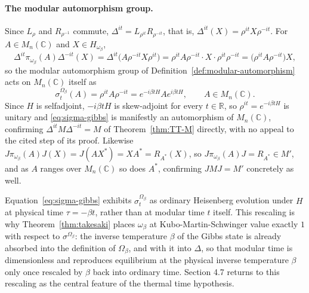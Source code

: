 \paragraph{The modular automorphism group.}
Since $L_\rho$ and $R_{\rho^{-1}}$ commute, $\Delta^{it} = L_{\rho^{it}}R_{\rho^{-it}}$, that is, $\Delta^{it}(X) = \rho^{it}X\rho^{-it}$. For $A \in M_n(\mathbb{C})$ and $X \in H_{\omega_\beta}$,
\[
\Delta^{it}\pi_{\omega_\beta}(A)\Delta^{-it}(X) = \Delta^{it}\big(A\rho^{-it}X\rho^{it}\big) = \rho^{it}A\rho^{-it}\cdot X \cdot \rho^{it}\rho^{-it} = \big(\rho^{it}A\rho^{-it}\big)X,
\]
so the modular automorphism group of Definition~\ref{def:modular-automorphism} acts on $M_n(\mathbb{C})$ itself as
\begin{equation}\label{eq:sigma-gibbs}
	\sigma_t^{\Omega_\beta}(A) = \rho^{it}A\rho^{-it} = e^{-i\beta t H}Ae^{i\beta t H}, \qquad A \in M_n(\mathbb{C}).
\end{equation}
Since $H$ is selfadjoint, $-i\beta t H$ is skew-adjoint for every $t \in \mathbb{R}$, so $\rho^{it}=e^{-i\beta t H}$ is unitary and \eqref{eq:sigma-gibbs} is manifestly an automorphism of $M_n(\mathbb{C})$, confirming $\Delta^{it}M\Delta^{-it}=M$ of Theorem~\ref{thm:TT-M} directly, with no appeal to the cited step of its proof. Likewise $J\pi_{\omega_\beta}(A)J(X) = J(AX^*) = XA^* = R_{A^*}(X)$, so $J\pi_{\omega_\beta}(A)J = R_{A^*} \in M'$, and as $A$ ranges over $M_n(\mathbb{C})$ so does $A^*$, confirming $JMJ=M'$ concretely as well.

Equation~\eqref{eq:sigma-gibbs} exhibits $\sigma^{\Omega_\beta}_t$ as ordinary Heisenberg evolution under $H$ at physical time $\tau = -\beta t$, rather than at modular time $t$ itself. This rescaling is why Theorem~\ref{thm:takesaki} places $\omega_\beta$ at Kubo-Martin-Schwinger value exactly $1$ with respect to $\sigma^{\Omega_\beta}$: the inverse temperature $\beta$ of the Gibbs state is already absorbed into the definition of $\Omega_\beta$, and with it into $\Delta$, so that modular time is dimensionless and reproduces equilibrium at the physical inverse temperature $\beta$ only once rescaled by $\beta$ back into ordinary time. Section 4.7 returns to this rescaling as the central feature of the thermal time hypothesis.

